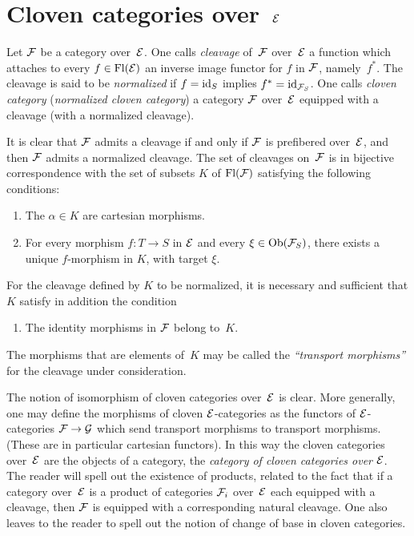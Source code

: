 \section{Cloven categories over~$\cal{E}$}
\label{VI.7}

\begin{definition}
\label{VI.7.1} Let $\cal{F}$ be a category over~$\cal{E}$. One
calls \emph{cleavage}
of~$\cal{F}$ over~$\cal{E}$ a function which attaches to every
$f\in\Fl(\cal{E})$ an inverse image functor for $f$ in $\cal{F}$,
namely~$f^*$. The cleavage is said to be \emph{normalized}
if $f=\id_S$ implies $f^*=\id_{\cal{F}_S}$. One calls
\emph{cloven category} (\resp \emph{normalized cloven
category})
a category $\cal{F}$ over~$\cal{E}$ equipped with a cleavage
(\resp with a normalized cleavage).
\end{definition}

It is clear that $\cal{F}$ admits a cleavage if and only if
$\cal{F}$ is prefibered over~$\cal{E}$, and then $\cal{F}$
admits a normalized cleavage. The set of cleavages on~$\cal{F}$
is in bijective correspondence with the set of subsets $K$ of
$\Fl(\cal{F})$ satisfying the following conditions:
\begin{enumerate}
\item[a)] The $\alpha\in K$ are cartesian morphisms.
\item[b)] For every morphism $f\colon T\to S$ in $\cal{E}$ and every
$\xi\in\Ob(\cal{F}_S)$, there exists a unique $f$-morphism in $K$, with
target $\xi$.
\end{enumerate}

For the cleavage defined by $K$ to be normalized, it is necessary and
sufficient that $K$ satisfy in addition the condition
\begin{enumerate}
\item[c)] The identity morphisms in $\cal{F}$ belong
to~$K$.
\end{enumerate}

The morphisms that are elements of~$K$ may be called the
\emph{``transport morphisms''}
for the cleavage under consideration.

The notion of isomorphism of cloven categories over~$\cal{E}$
is clear. More generally, one may define the
morphisms of cloven $\cal{E}$-categories as the functors
of $\cal{E}$-categories $\cal{F}\to \cal{G}$ which send
transport morphisms to transport morphisms. (These are in
particular cartesian functors). In this way the
cloven categories over~$\cal{E}$ are the objects of a
category, the \emph{category of cloven categories
over} $\cal{E}$. The reader will spell out the existence of products,
related to the fact that if a category over~$\cal{E}$ is a product of
categories $\cal{F}_i$ over~$\cal{E}$ each equipped with a cleavage,
then $\cal{F}$ is equipped with a corresponding natural cleavage. One
also leaves to the reader to spell out the notion of change of base
in cloven categories.

